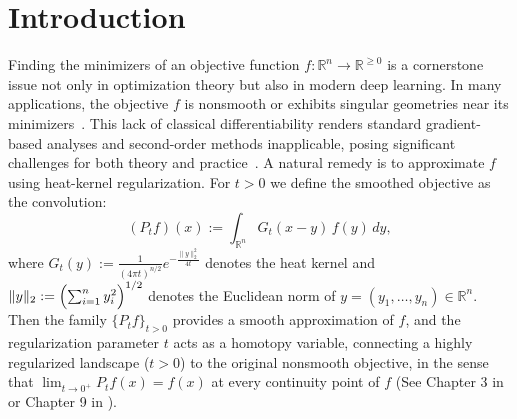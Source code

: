 \documentclass{article}
\begin{document}
\section{Introduction}
Finding the minimizers of an objective function $f:\mathbb{R}^n\to\mathbb{R}^{\ge0}$ is a cornerstone issue not only in optimization theory but also in modern deep learning. In many applications, the objective $f$ is nonsmooth or exhibits singular geometries near its minimizers~\cite{fuduli2004minimizing,nesterov2005smooth,kiwiel2007convergence,ma2022beyond,jia2025first, jo2026neural}. This lack of classical differentiability renders standard gradient-based analyses and second-order methods inapplicable, posing significant challenges for both theory and practice~\cite{garmanjani2013smoothing, wang2022differentially}. A natural remedy is to approximate $f$ using heat-kernel regularization. For $t>0$ we define the smoothed objective as the convolution:
\begin{equation}\label{eq:def-Pt}
(P_t f)(x):=\int_{\mathbb{R}^n} G_t(x-y)\,f(y)\,dy,
\end{equation}
where $G_t(y):=\frac{1}{(4\pi t)^{n/2}}e^{-\frac{\|y\|_2^2}{4t}}$ denotes the heat kernel and $\|y\|_2:=\Bigl(\sum_{i=1}^n y_i^2\Bigr)^{1/2}$ denotes the Euclidean norm of $y=(y_1,\dots,y_n)\in\mathbb R^n$. Then the family \(\{P_t f\}_{t>0}\) provides a smooth approximation of \(f\), and the regularization parameter $t$ acts as a homotopy variable, connecting a highly regularized landscape ($t>0$) to the original nonsmooth objective, in the sense that $\lim_{t\to0^+} P_t f(x)=f(x)$ at every continuity point of $f$ (See Chapter 3 in \cite{stein2009real} or Chapter 9 in \cite{brezis2011functional}). 
\end{document}
